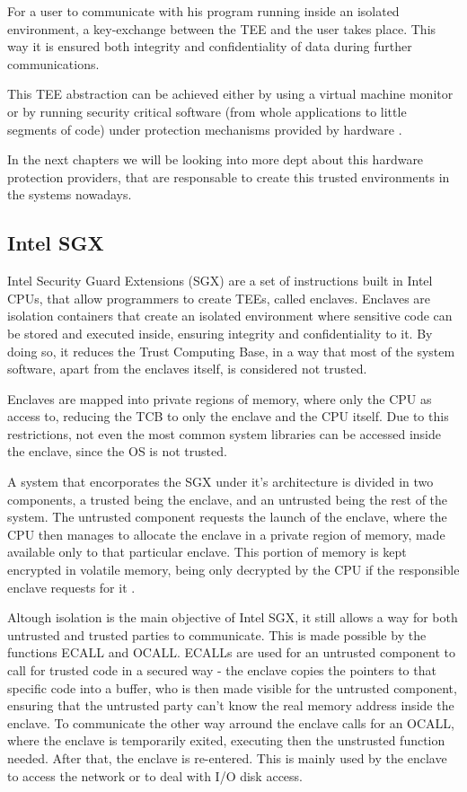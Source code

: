 For a user to communicate with his program running inside an isolated environment, a key-exchange between the TEE and the user takes place. This way it is ensured both integrity and confidentiality of data during further communications.

This TEE abstraction can be achieved either by using a virtual machine monitor or by running security critical software (from whole applications to little segments of code) under protection mechanisms provided by hardware \cite{pcopThesis}. 

In the next chapters we will be looking into more dept about this hardware protection providers, that are responsable to create this trusted environments in the systems nowadays.

\subsection{Intel SGX}

Intel Security Guard Extensions (SGX) are a set of instructions built in Intel CPUs, that allow programmers to create TEEs, called enclaves. Enclaves are isolation containers that create an isolated environment where sensitive code can be stored and executed inside, ensuring integrity and confidentiality to it. By doing so, it reduces the Trust Computing Base, in a way that most of the system software, apart from the enclaves itself, is considered not trusted.

Enclaves are mapped into private regions of memory, where only the CPU as access to, reducing the TCB to only the enclave and the CPU itself. Due to this restrictions, not even the most common system libraries can be accessed inside the enclave, since the OS is not trusted. 

A system that encorporates the SGX under it's architecture is divided in two components, a trusted being the enclave, and an untrusted being the rest of the system. The untrusted component requests the launch of the enclave, where the CPU then manages to allocate the enclave in a private region of memory, made available only to that particular enclave. This portion of memory is kept encrypted in volatile memory, being only decrypted by the CPU if the responsible enclave requests for it \cite{guiBorgesThesis}.

Altough isolation is the main objective of Intel SGX, it still allows a way for both  untrusted and trusted parties to communicate. This is made possible by the functions ECALL and OCALL. ECALLs are used for an untrusted component to call for trusted code in a secured way - the enclave copies the pointers to that specific code into a buffer, who is then made visible for the untrusted component, ensuring that the untrusted party can't know the real memory address inside the enclave. To communicate the other way arround the enclave calls for an OCALL, where the enclave is temporarily exited, executing then the unstrusted function needed. After that, the enclave is re-entered. This is mainly used by the enclave to access the network or to deal with I/O disk access.


